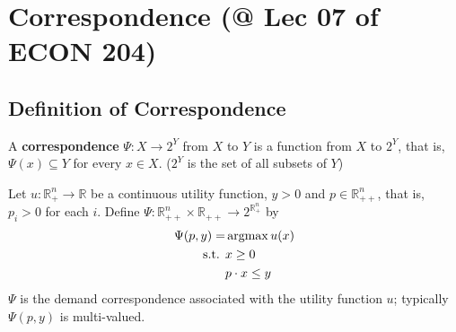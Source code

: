 \documentclass[11pt]{elegantbook}
\newcommand{\argmax}{\operatornamewithlimits{argmax}}
\begin{document}
\section{Correspondence \small{(@ Lec 07 of ECON 204)}}
\subsection{Definition of Correspondence}
\begin{definition}[Correspondence]
    \normalfont
    A \textbf{correspondence} $\Psi : X \rightarrow 2^Y$ from $X$ to $Y$ is a function from $X$ to $2^Y$, that is, $\Psi(x) \subseteq Y$ for every $x \in X$. ($2^Y$ is the set of all subsets of $Y$)
\end{definition}
\begin{example}
Let $u : \mathbb{R}_+^n \rightarrow \mathbb{R}$ be a continuous utility function, $y > 0$ and $p \in \mathbb{R}_{++}^n$, that is, $p_i > 0$ for each $i$. Define $\Psi : \mathbb{R}_{++}^n \times \mathbb{R}_{++} \rightarrow 2^{\mathbb{R}_{+}^n}$ by
\begin{equation}
    \begin{aligned}
        \Psi(p,y)=&\argmax u(x)\\
        \textnormal{s.t. }&x\geq 0\\
        &p\cdot x\leq y
    \end{aligned}
    \nonumber
\end{equation}
$\Psi$ is the demand correspondence associated with the utility function $u$; typically $\Psi(p, y)$ is multi-valued.
\end{example}
\end{document}
